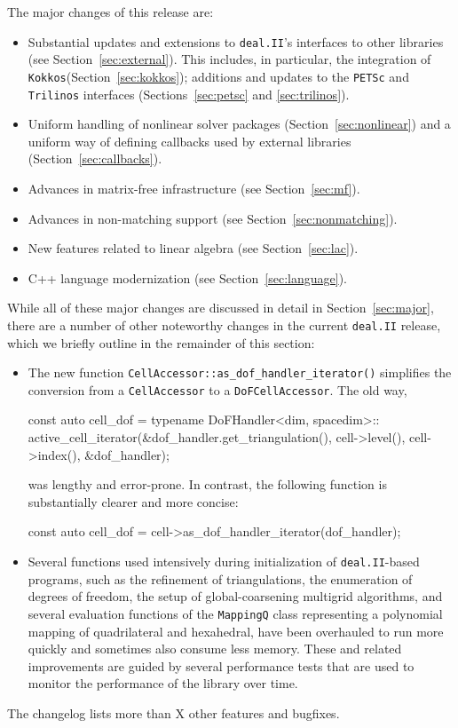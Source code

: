 \documentclass{ansarticle-preprint}
\newcommand{\specialword}[1]{\texttt{#1}}
\newcommand{\dealii}{{\specialword{deal.II}}\xspace}
\newcommand{\trilinos}{{\specialword{Trilinos}}\xspace}
\newcommand{\petsc}{\specialword{PETSc}\xspace}
\newcommand{\kokkos}{{\specialword{Kokkos}}\xspace}
\begin{document}
The major changes of this release are:
%
\begin{itemize}
  \item Substantial updates and extensions to \dealii{}'s interfaces
    to other libraries (see Section~\ref{sec:external}). This
    includes, in particular, the integration of \kokkos (Section~\ref{sec:kokkos});
    additions and updates to the \petsc and \trilinos
    interfaces
    (Sections~\ref{sec:petsc} and \ref{sec:trilinos}).
  \item Uniform handling of nonlinear solver
  packages (Section~\ref{sec:nonlinear}) and a uniform
    way of defining callbacks used by external libraries (Section~\ref{sec:callbacks}).
  \item Advances in matrix-free infrastructure (see Section~\ref{sec:mf}).
  \item Advances in non-matching support (see Section~\ref{sec:nonmatching}).
  \item New features related to linear algebra (see Section~\ref{sec:lac}).
  \item C++ language modernization (see Section~\ref{sec:language}).
\end{itemize}
%

While all of these major changes are discussed in detail in
Section~\ref{sec:major}, there
are a number of other noteworthy changes in the current \dealii release,
which we briefly outline in the remainder of this section:
%
\begin{itemize}
  \item The new function \texttt{CellAccessor::as\_dof\_handler\_iterator()}
  simplifies the conversion from a \texttt{Cell\-Accessor} to a \texttt{DoF\-Cell\-Accessor}.
  The old way,
\begin{c++}
const auto cell_dof = typename DoFHandler<dim, spacedim>::
  active_cell_iterator(&dof_handler.get_triangulation(),
    cell->level(), cell->index(), &dof_handler);
\end{c++}
was lengthy and error-prone. In contrast, the following function is
substantially clearer and more concise:
\begin{c++}
const auto cell_dof = cell->as_dof_handler_iterator(dof_handler);
\end{c++}
\item Several functions used intensively during initialization of
  \dealii-based programs, such as the refinement of triangulations, the
  enumeration of degrees of freedom, the setup of global-coarsening multigrid
  algorithms, and several evaluation functions of the \texttt{MappingQ} class
  representing a polynomial mapping of quadrilateral and hexahedral, have been
  overhauled to run more quickly and sometimes also consume less memory. These
  and related improvements are guided by several performance tests that are
  used to monitor the performance of the library over time.
\end{itemize}
%
The changelog lists more than X other features and bugfixes.
\end{document}
